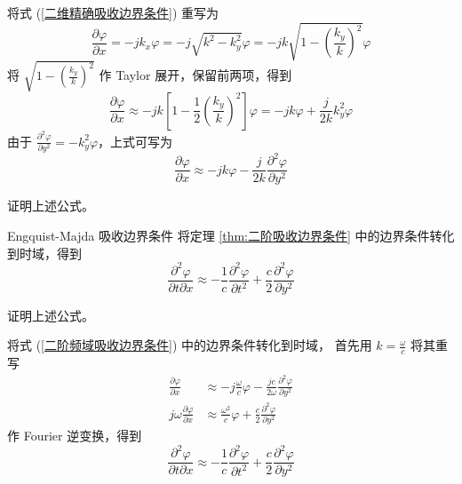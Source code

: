 \begin{solution}
    将式 (\ref{二维精确吸收边界条件}) 重写为
    \begin{equation*}
        \frac{\partial \varphi}{\partial x}
        =-jk_x\varphi
        =-j\sqrt{k^2-k_y^2}\varphi
        =-jk\sqrt{1-\left(\frac{k_y}{k}\right)^2}\varphi
    \end{equation*}
    将 $\sqrt{1-\left(\frac{k_y}{k}\right)^2}$ 作 Taylor 展开，保留前两项，得到
    \begin{equation*}
        \frac{\partial \varphi}{\partial x}
        \approx -jk\left[
            1-\frac{1}{2}\left(\frac{k_y}{k}\right)^2
        \right]\varphi
        =-jk\varphi+\frac{j}{2k}k_y^2\varphi
    \end{equation*}
    由于 $\frac{\partial^2 \varphi}{\partial y^2}=-k_y^2\varphi$，上式可写为
    \begin{equation*}
        \frac{\partial \varphi}{\partial x}
        \approx -jk\varphi-\frac{j}{2k}\frac{\partial^2 \varphi}{\partial y^2}
    \end{equation*}
\end{solution}

\begin{exercise}
    证明上述公式。
\end{exercise}

\begin{theorem}{Engquist-Majda 吸收边界条件}
    将定理 \ref{thm:二阶吸收边界条件} 中的边界条件转化到时域，得到
    \begin{equation}
        \frac{\partial^2 \varphi}{\partial t \partial x}
        \approx -\frac{1}{c}
        \frac{\partial^2 \varphi}{\partial t^2}
        +\frac{c}{2}\frac{\partial^2 \varphi}{\partial y^2}
        \label{二阶时域吸收边界条件}
    \end{equation}
\end{theorem}

\begin{exercise}
    证明上述公式。
\end{exercise}

\begin{solution}
    将式 (\ref{二阶频域吸收边界条件}) 中的边界条件转化到时域，
    首先用 $k=\frac{\omega}{c}$ 将其重写
    \begin{align*}
        \frac{\partial \varphi}{\partial x}
        &\approx-j\frac{\omega}{c}\varphi
        -\frac{jc}{2\omega}\frac{\partial^2 \varphi}{\partial y^2}\\
        j\omega\frac{\partial \varphi}{\partial x}
        &\approx\frac{\omega^2}{c}\varphi
        +\frac{c}{2}\frac{\partial^2 \varphi}{\partial y^2}
    \end{align*}
    作 Fourier 逆变换，得到
    \begin{equation*}
        \frac{\partial^2 \varphi}{\partial t \partial x}
        \approx -\frac{1}{c}
        \frac{\partial^2 \varphi}{\partial t^2}
        +\frac{c}{2}\frac{\partial^2 \varphi}{\partial y^2}
    \end{equation*}
\end{solution}

